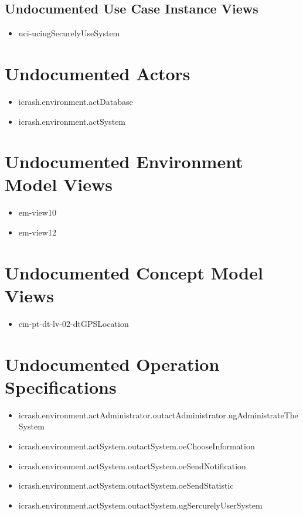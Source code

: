 \subsection[Undocumented Use Case Instance Views]{Undocumented Use Case Instance Views}
\begin{itemize}
\item uci-uciugSecurelyUseSystem 
\end{itemize}


\section[Undocumented Actors]{Undocumented Actors}
\begin{itemize}
\item icrash.environment.actDatabase 
\item icrash.environment.actSystem 
\end{itemize}


\section[Undocumented Environment Model Views]{Undocumented Environment Model Views}
\begin{itemize}
\item em-view10 
\item em-view12 
\end{itemize}












\section[Undocumented Concept Model Views]{Undocumented Concept Model Views}
\begin{itemize}
\item cm-pt-dt-lv-02-dtGPSLocation 
\end{itemize}


\section[Undocumented Operation Specifications]{Undocumented Operation Specifications}
\begin{itemize}
\item icrash.environment.actAdministrator.outactAdministrator.ugAdministrateTheSystem 
\item icrash.environment.actSystem.outactSystem.oeChooseInformation 
\item icrash.environment.actSystem.outactSystem.oeSendNotification 
\item icrash.environment.actSystem.outactSystem.oeSendStatistic 
\item icrash.environment.actSystem.outactSystem.ugSercurelyUserSystem 
\end{itemize}





